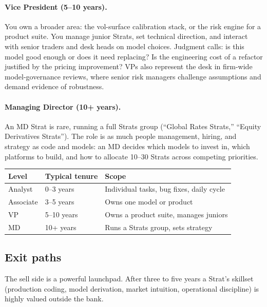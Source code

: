 \paragraph{Vice President (5--10 years).}
You own a broader area: the vol-surface calibration stack, or the
risk engine for a product suite.  You manage junior Strats, set
technical direction, and interact with senior traders and desk
heads on model choices.  Judgment calls: is this model good enough
or does it need replacing?  Is the engineering cost of a refactor
justified by the pricing improvement?  VPs also represent the desk
in firm-wide model-governance reviews, where senior risk managers
challenge assumptions and demand evidence of robustness.

\paragraph{Managing Director (10+ years).}
An MD Strat is rare, running a full Strats group (``Global Rates
Strats,'' ``Equity Derivatives Strats'').  The role is as much
people management, hiring, and strategy as code and models: an MD
decides which models to invest in, which platforms to build, and
how to allocate 10--30 Strats across competing priorities.

\begin{keyfactbox}
\begin{tabular}{lll}
\toprule
\textbf{Level} & \textbf{Typical tenure} & \textbf{Scope} \\
\midrule
Analyst   & 0--3 years  & Individual tasks, bug fixes, daily cycle \\
Associate & 3--5 years  & Owns one model or product \\
VP        & 5--10 years & Owns a product suite, manages juniors \\
MD        & 10+ years   & Runs a Strats group, sets strategy \\
\bottomrule
\end{tabular}
\end{keyfactbox}

\subsection{Exit paths}

The sell side is a powerful launchpad.  After three to five years
a Strat's skillset (production coding, model derivation, market
intuition, operational discipline) is highly valued outside the
bank.

